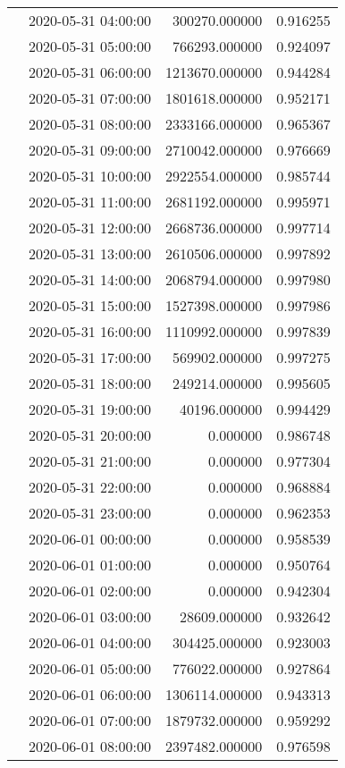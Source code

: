 \begin{tabular}{llrr}
 & 2020-05-31 04:00:00 & 300270.000000 & 0.916255 \\
 & 2020-05-31 05:00:00 & 766293.000000 & 0.924097 \\
 & 2020-05-31 06:00:00 & 1213670.000000 & 0.944284 \\
 & 2020-05-31 07:00:00 & 1801618.000000 & 0.952171 \\
 & 2020-05-31 08:00:00 & 2333166.000000 & 0.965367 \\
 & 2020-05-31 09:00:00 & 2710042.000000 & 0.976669 \\
 & 2020-05-31 10:00:00 & 2922554.000000 & 0.985744 \\
 & 2020-05-31 11:00:00 & 2681192.000000 & 0.995971 \\
 & 2020-05-31 12:00:00 & 2668736.000000 & 0.997714 \\
 & 2020-05-31 13:00:00 & 2610506.000000 & 0.997892 \\
 & 2020-05-31 14:00:00 & 2068794.000000 & 0.997980 \\
 & 2020-05-31 15:00:00 & 1527398.000000 & 0.997986 \\
 & 2020-05-31 16:00:00 & 1110992.000000 & 0.997839 \\
 & 2020-05-31 17:00:00 & 569902.000000 & 0.997275 \\
 & 2020-05-31 18:00:00 & 249214.000000 & 0.995605 \\
 & 2020-05-31 19:00:00 & 40196.000000 & 0.994429 \\
 & 2020-05-31 20:00:00 & 0.000000 & 0.986748 \\
 & 2020-05-31 21:00:00 & 0.000000 & 0.977304 \\
 & 2020-05-31 22:00:00 & 0.000000 & 0.968884 \\
 & 2020-05-31 23:00:00 & 0.000000 & 0.962353 \\
 & 2020-06-01 00:00:00 & 0.000000 & 0.958539 \\
 & 2020-06-01 01:00:00 & 0.000000 & 0.950764 \\
 & 2020-06-01 02:00:00 & 0.000000 & 0.942304 \\
 & 2020-06-01 03:00:00 & 28609.000000 & 0.932642 \\
 & 2020-06-01 04:00:00 & 304425.000000 & 0.923003 \\
 & 2020-06-01 05:00:00 & 776022.000000 & 0.927864 \\
 & 2020-06-01 06:00:00 & 1306114.000000 & 0.943313 \\
 & 2020-06-01 07:00:00 & 1879732.000000 & 0.959292 \\
 & 2020-06-01 08:00:00 & 2397482.000000 & 0.976598 \\

\end{tabular}
